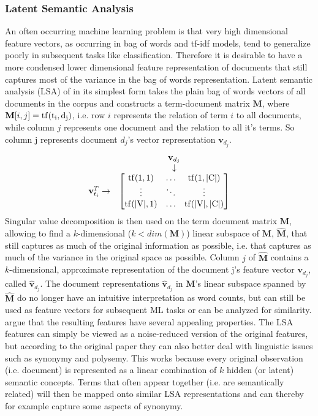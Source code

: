 \subsubsection*{Latent Semantic Analysis}

An often occurring machine learning problem is that very high dimensional
feature vectors, as occurring in bag of words and tf-idf models,
tend to generalize poorly in subsequent tasks like classification.
Therefore it is desirable to have a more condensed lower dimensional
feature representation of documents that still captures most of the
variance in the bag of words representation. Latent semantic analysis
(LSA) of \citet{Deerwester1990} in its simplest form takes the plain bag of words
vectors of all documents in the corpus and constructs a term-document
matrix $\textbf{M}$, where $\textbf{M}[i,j]=\rm{tf}(t_{i},d_{j})$, i.e. row $i$ represents
the relation of term $i$ to all documents, while column $j$ represents
one document and the relation to all it's terms. So column j represents document $d_j$'s vector representation $\textbf{v}_{d_j}$.
\[ 
\begin{matrix} & \textbf{v}_{d_j}\\
& \downarrow\\
\textbf{v}_{t_i}^{T}\rightarrow & \begin{bmatrix}\rm{tf}(1,1) & \dots & \rm{tf}(1,|C|)\\
\vdots & \ddots & \vdots\\
\rm{tf}(|V|,1) & \dots & \rm{tf}(|V|,|C|)
\end{bmatrix}
\end{matrix}
\]
Singular value decomposition is then used on the term document matrix
$\textbf{M}$, allowing to find a $k$-dimensional ($k<dim(\textbf{M})$) linear subspace
of $\textbf{M}$, $\hat{\textbf{M}}$, that still captures as much of the original information
as possible, i.e. that captures as much of the variance in the original
space as possible. Column $j$ of $\hat{\textbf{M}}$ contains a $k$-dimensional,
approximate representation of the document j's feature vector $\textbf{v}_{d_{j}}$, called $\hat{\textbf{v}}_{d_{j}}$.
The document representations $\hat{\textbf{v}}_{d_j}$ in $\textbf{M}$'s linear subspace
spanned by $\hat{\textbf{M}}$ do no longer have an intuitive interpretation
as word counts, but can still be used as feature vectors for subsequent
ML tasks or can be analyzed for similarity. \citet{Deerwester1990} argue
that the resulting features have several appealing properties. The
LSA features can simply be viewed as a noise-reduced version of the
original features, but according to the original paper they can also
better deal with linguistic issues such as synonymy and polysemy.
This works because every original observation (i.e. document) is represented
as a linear combination of $k$ hidden (or latent) semantic concepts.
Terms that often appear together (i.e. are semantically related) will
then be mapped onto similar LSA representations and can thereby for
example capture some aspects of synonymy.

